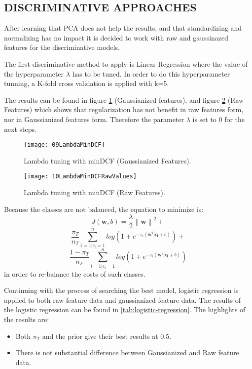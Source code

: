 \documentclass[12pt, twocolumn]{article}
\begin{document}
  \subsection{DISCRIMINATIVE APPROACHES}
  After learning that PCA does not help the results, and that standardizing and
  normalizing has no impact it is decided to work with raw and gaussinazed features for the discriminative models.
  
  The first discriminative method to apply is Linear Regression where the
  value of the hyperparameter $\lambda$ has to be tuned. In order to do this
  hyperparameter tunning, a K-fold cross validation is applied with k=5.

  The results can be found in figure \ref{fig:09LambdaMinDCF} (Gaussianized
  features), and figure \ref{fig:10LambdaMinDCFRawValues} (Raw Features)
  which shows that regularization has not benefit in raw features form, nor in
  Gaussianized features form. Therefore the parameter $\lambda$ is set to 0 for the next
  steps.

  \begin{figure}[ht]
    \centering
    \texttt{[image: 09LambdaMinDCF]}
    \caption{Lambda tuning with minDCF (Gaussianized Features).}
    \label{fig:09LambdaMinDCF}
  \end{figure}

  \begin{figure}[ht]
    \centering
    \texttt{[image: 10LambdaMinDCFRawValues]}
    \caption{Lambda tuning with minDCF (Raw Features).}
    \label{fig:10LambdaMinDCFRawValues}
  \end{figure}
  
  Because the classes are not balanced, the equation to minimize is: $$J(\mathbf{w},b)= \frac{\lambda}{2}\left \| \mathbf{w} \right \|^{2}+$$ 
  $$\frac{\pi_T }{n_T}\sum_{i=1|c_i=1}^{n} log(1+e^{-z_i(\mathbf{w}^{T} \mathbf{x_i}+b)})+$$
  $$\frac{1-\pi_T}{n_F} \sum_{i=1|c_i=1}^{n} log(1+e^{-z_i(\mathbf{w}^{T} \mathbf{x_i}+b)})$$
   in order to re-balance the costs of such classes. 

 Continuing with the process of searching the best model, logistic regression is applied to
 both raw feature data and gaussianized feature data. The results of the logistic regression can be found in \ref{tab:logistic-regression}. The highlights of the results are:
 \begin{itemize}
     \item Both $\pi_T$ and the prior give their best results at 0.5.
     \item There is not substantial difference between Gaussianized and Raw feature data.
 \end{itemize}
 
\end{document}
